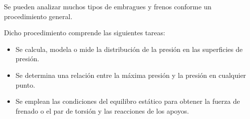\documentclass[12pt, letterpaper]{extarticle}
\begin{document}

Se pueden analizar muchos tipos de embragues y frenos conforme un procedimiento general.

Dicho procedimiento comprende las siguientes tareas:
\begin{itemize}
    \item Se calcula, modela o mide la distribución de la presión en las superficies de presión.
    \item Se determina una relación entre la máxima presión y la presión en cualquier punto.
    \item Se emplean las condiciones del equilibro estático para obtener la fuerza de frenado o el par de torsión y las reacciones de los apoyos.
\end{itemize}
\end{document}
